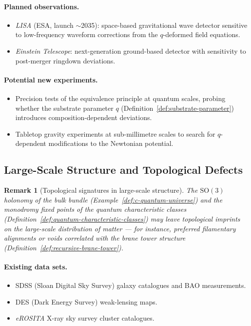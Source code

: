 \documentclass[12pt,a4paper]{report}
\newtheorem{remark}[theorem]{Remark}
\begin{document}
\paragraph{Planned observations.}
\begin{itemize}
  \item \emph{LISA} (ESA, launch $\sim$2035): space-based gravitational
        wave detector sensitive to low-frequency waveform corrections from the
        $q$-deformed field equations.
  \item \emph{Einstein Telescope}: next-generation ground-based detector
        with sensitivity to post-merger ringdown deviations.
\end{itemize}

\paragraph{Potential new experiments.}
\begin{itemize}
  \item Precision tests of the equivalence principle at quantum scales,
        probing whether the substrate parameter $q$
        (Definition~\ref{def:substrate-parameter}) introduces
        composition-dependent deviations.
  \item Tabletop gravity experiments at sub-millimetre scales to search for
        $q$-dependent modifications to the Newtonian potential.
\end{itemize}

\subsection{Large-Scale Structure and Topological Defects}
\label{sec:large-scale-structure}

\begin{remark}[Topological signatures in large-scale structure]
\label{rem:topological-defects}
The $\mathrm{SO}(3)$ holonomy of the bulk bundle
(Example~\ref{def:c-quantum-universe}) and the monodromy fixed points of the
quantum characteristic classes (Definition~\ref{def:quantum-characteristic-classes})
may leave topological imprints on the large-scale distribution of matter --- for
instance, preferred filamentary alignments or voids correlated with the brane
tower structure (Definition~\ref{def:recursive-brane-tower}).
\end{remark}

\paragraph{Existing data sets.}
\begin{itemize}
  \item SDSS (Sloan Digital Sky Survey) galaxy catalogues and BAO
        measurements.
  \item DES (Dark Energy Survey) weak-lensing maps.
  \item \emph{eROSITA} X-ray sky survey cluster catalogues.
\end{itemize}
\end{document}
